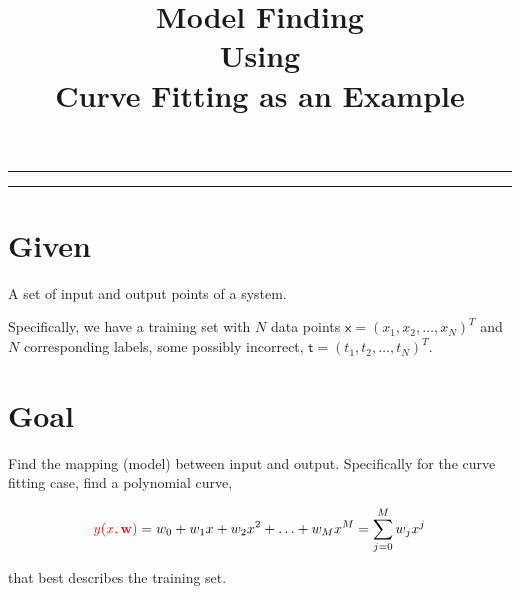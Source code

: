 
\title{Model Finding\\Using\\Curve Fitting as an Example}
\date{}

\maketitle
\rule[0pt]{\textwidth}{1pt}
\tableofcontents
\rule[0pt]{\textwidth}{1pt}

\section{Given}
A set of input and output points of a system.

Specifically, we have a training set with $N$ data points $\mathsf{x} = (x_1, x_2, \ldots, x_N)^T$ and $N$ corresponding labels, some possibly incorrect, $\mathsf{t} = (t_1, t_2, \ldots, t_N)^T$.


\section{Goal}
Find the mapping (model) between input and output.  Specifically for the curve fitting case, find a polynomial curve,

\begin{equation}
{\color{red}y(x,\mathbf{w})} = w_0 + w_1x + w_2 x^2 + \ldots + w_Mx^M = \sum\limits_{j=0}^M w_jx^j
\end{equation}

that best describes the training set.

